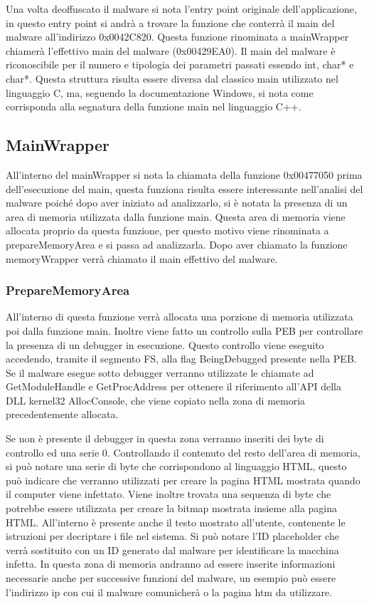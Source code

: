 \documentclass[]{article}
\begin{document}
Una volta deoffuscato il malware si nota l'entry point originale dell'applicazione, in questo entry point si andrà a trovare la funzione che conterrà il main del malware all'indirizzo 0x0042C820. Questa funzione rinominata a mainWrapper chiamerà l'effettivo main del malware (0x00429EA0). Il main del malware è riconoscibile per il numero e tipologia dei parametri passati essendo int, char* e char*.  Questa struttura risulta essere diversa dal classico main utilizzato nel linguaggio C, ma, seguendo la documentazione Windows, si nota come corrisponda alla segnatura della funzione main nel linguaggio C++. 

\subsection{MainWrapper}
All'interno del mainWrapper si nota la chiamata della funzione 0x00477050 prima dell'esecuzione del main, questa funziona risulta essere interessante nell'analisi del malware poiché dopo aver iniziato ad analizzarlo, si è notata la presenza di un area di memoria utilizzata dalla funzione main. Questa area di memoria viene allocata proprio da questa funzione, per questo motivo viene rinominata a prepareMemoryArea e si passa ad analizzarla. Dopo aver chiamato la funzione memoryWrapper verrà chiamato il main effettivo del malware.

\subsubsection{PrepareMemoryArea}
All'interno di questa funzione verrà allocata una porzione di memoria utilizzata poi dalla funzione main. Inoltre viene fatto un controllo sulla PEB per controllare la presenza di un debugger in esecuzione. Questo controllo viene eseguito accedendo, tramite il segmento FS, alla flag BeingDebugged presente nella PEB. Se il malware esegue sotto debugger verranno utilizzate le chiamate ad GetModuleHandle e GetProcAddress per ottenere il riferimento all'API della DLL kernel32 AllocConsole, che viene copiato nella zona di memoria precedentemente allocata. 

Se non è presente il debugger in questa zona verranno inseriti dei byte di controllo ed una serie 0. Controllando il contenuto del resto dell'area di memoria, si può notare una serie di byte che corrispondono al linguaggio HTML, questo può indicare che verranno utilizzati per creare la pagina HTML mostrata quando il computer viene infettato. Viene inoltre trovata una sequenza di byte che potrebbe essere utilizzata per creare la bitmap mostrata insieme alla pagina HTML. All'interno è presente anche il testo mostrato all'utente, contenente le istruzioni per decriptare i file nel sistema. Si può notare l'ID placeholder che verrà sostituito con un ID generato dal malware per identificare la macchina infetta. 
In questa zona di memoria andranno ad essere inserite informazioni necessarie anche per successive funzioni del malware, un esempio può essere l'indirizzo ip con cui il malware comunicherà o la pagina htm da utilizzare. 
\end{document}
